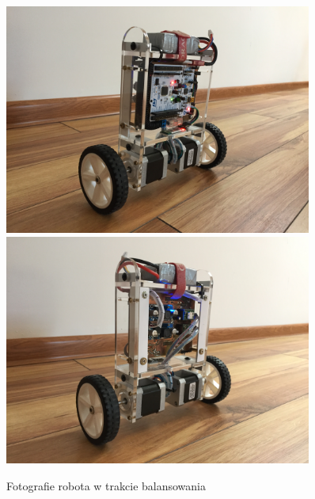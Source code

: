 \begin{figure}[h!]
    \centering
    \includegraphics[width=0.9\textwidth]{Rysunki/Rozdzial05/Robot_przod.JPG}
    \includegraphics[width=0.9\textwidth]{Rysunki/Rozdzial05/Robot_tyl.JPG}
    \caption{Fotografie robota w trakcie balansowania}
\end{figure}
